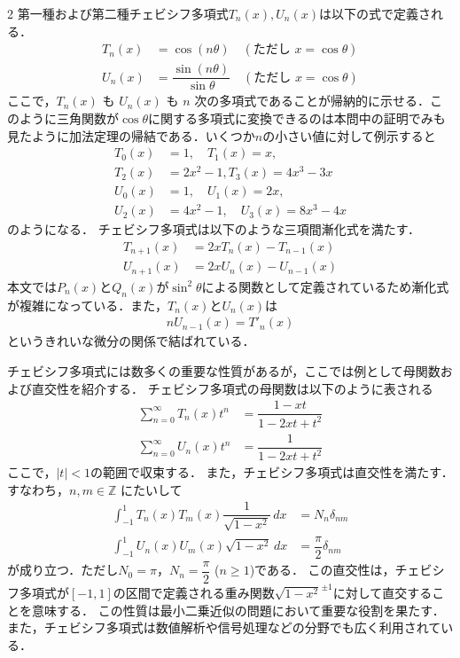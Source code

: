 \documentclass[../../main.tex]{subfiles}
\begin{document}
\begin{multicols}{2}
  第一種および第二種チェビシフ多項式$T_n(x), U_n(x)$は以下の式で定義される．
  \begin{align}
    T_n(x) & = \cos(n\theta) \quad (\text{ただし } x = \cos\theta)                    \\
    U_n(x) & = \dfrac{\sin(n\theta)}{\sin\theta} \quad (\text{ただし } x = \cos\theta)
  \end{align}
  ここで，$T_n(x)$ も $U_n(x)$ も $n$ 次の多項式であることが帰納的に示せる．このように三角関数が$\cos\theta$に関する多項式に変換できるのは本問中の証明でみも見たように加法定理の帰結である．いくつか$n$の小さい値に対して例示すると
  \begin{align}
    T_0(x) & = 1, \quad T_1(x) = x,               \\
    T_2(x) & = 2x^2 - 1, T_3(x) = 4x^3 - 3x       \\
    U_0(x) & = 1, \quad U_1(x) = 2x,              \\
    U_2(x) & = 4x^2 - 1, \quad U_3(x) = 8x^3 - 4x
  \end{align}
  のようになる．
  チェビシフ多項式は以下のような三項間漸化式を満たす．
  \begin{align}
    T_{n+1}(x) & = 2xT_n(x) - T_{n-1}(x) \\
    U_{n+1}(x) & = 2xU_n(x) - U_{n-1}(x)
  \end{align}
  本文では$P_n(x)$と$Q_n(x)$が$\sin^{2}\theta$による関数として定義されているため漸化式が複雑になっている．また，$T_n(x)$と$U_n(x)$は
  \begin{align}
    nU_{n-1}(x) = T'_n(x)
  \end{align}
  というきれいな微分の関係で結ばれている．

  チェビシフ多項式には数多くの重要な性質があるが，ここでは例として母関数および直交性を紹介する．
  チェビシフ多項式の母関数は以下のように表される
  \begin{align}
    \sum_{n=0}^{\infty} T_n(x) t^n & = \dfrac{1 - xt}{1 - 2xt + t^2} \\
    \sum_{n=0}^{\infty} U_n(x) t^n & = \dfrac{1}{1 - 2xt + t^2}
  \end{align}
  ここで，$|t|<1$の範囲で収束する．
  また，チェビシフ多項式は直交性を満たす．
  すなわち，$n, m \in \mathbb{Z}$ にたいして
  \begin{align}
    \int_{-1}^{1} T_n(x) T_m(x)\dfrac{1}{\sqrt{1-x^2}} \, dx & = N_{n}\delta_{nm}          \\
    \int_{-1}^{1}  U_n(x) U_m(x) \sqrt{1-x^2} \, dx         & = \dfrac{\pi}{2} \delta_{nm}
  \end{align}
  が成り立つ．ただし$N_0=\pi$，$N_n = \dfrac{\pi}{2}$ ($n \ge 1$)である．
  この直交性は，チェビシフ多項式が$[-1, 1]$の区間で定義される重み関数$\sqrt{1-x^2}^{\pm 1}$に対して直交することを意味する．
  この性質は最小二乗近似の問題において重要な役割を果たす．
  また，チェビシフ多項式は数値解析や信号処理などの分野でも広く利用されている．


\end{multicols}
\end{document}
